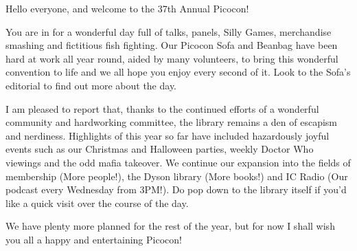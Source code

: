 Hello everyone, and welcome to the 37th Annual Picocon!

You are in for a wonderful day full of talks, panels, Silly Games,
merchandise smashing and fictitious fish fighting. Our Picocon Sofa
and Beanbag have been hard at work all year round, aided by many
volunteers, to bring this wonderful convention to life and we all hope
you enjoy every second of it. Look to the Sofa's editorial to find out
more about the day.

I am pleased to report that, thanks to the continued efforts of a
wonderful community and hardworking committee, the library remains a
den of escapism and nerdiness. Highlights of this year so far have
included hazardously joyful events such as our Christmas and Halloween
parties, weekly Doctor Who viewings and the odd mafia takeover. We
continue our expansion into the fields of membership (More people!),
the Dyson library (More books!) and IC Radio (Our podcast every
Wednesday from 3PM!). Do pop down to the library itself if you'd like a
quick visit over the course of the day.

We have plenty more planned for the rest of the year, but for now I
shall wish you all a happy and entertaining Picocon!
